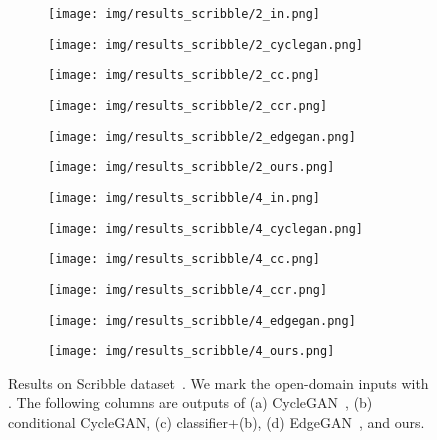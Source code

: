 \documentclass[10pt,twocolumn,letterpaper]{article}
\begin{document}
\begin{figure}[tbp]
\begin{center}
  \begin{subfigure}[b]{\scribblewidth\linewidth}
  \texttt{[image: img/results\_scribble/2\_in.png]}
  \end{subfigure}
  \begin{subfigure}[b]{\scribblewidth\linewidth}
  \texttt{[image: img/results\_scribble/2\_cyclegan.png]}
  \end{subfigure}
   \begin{subfigure}[b]{\scribblewidth\linewidth}
  \texttt{[image: img/results\_scribble/2\_cc.png]}
  \end{subfigure}
   \begin{subfigure}[b]{\scribblewidth\linewidth}
  \texttt{[image: img/results\_scribble/2\_ccr.png]}
  \end{subfigure}
 \begin{subfigure}[b]{\scribblewidth\linewidth}
  \texttt{[image: img/results\_scribble/2\_edgegan.png]}
  \end{subfigure}
  \begin{subfigure}[b]{\scribblewidth\linewidth}
  \texttt{[image: img/results\_scribble/2\_ours.png]}
  \end{subfigure}
  
  \begin{subfigure}[b]{\scribblewidth\linewidth}
  \texttt{[image: img/results\_scribble/4\_in.png]}
  \end{subfigure}
  \begin{subfigure}[b]{\scribblewidth\linewidth}
  \texttt{[image: img/results\_scribble/4\_cyclegan.png]}
  \end{subfigure}
\begin{subfigure}[b]{\scribblewidth\linewidth}
  \texttt{[image: img/results\_scribble/4\_cc.png]}
  \end{subfigure}
\begin{subfigure}[b]{\scribblewidth\linewidth}
  \texttt{[image: img/results\_scribble/4\_ccr.png]}
  \end{subfigure}
\begin{subfigure}[b]{\scribblewidth\linewidth}
  \texttt{[image: img/results\_scribble/4\_edgegan.png]}
  \end{subfigure}
  \begin{subfigure}[b]{\scribblewidth\linewidth}
  \texttt{[image: img/results\_scribble/4\_ours.png]}
  \end{subfigure}
\end{center}
\caption{Results on Scribble dataset~\cite{ghosh2019interactive}. We mark the open-domain inputs with \textcolor{blue}{}. The following columns are outputs of (a) CycleGAN~\cite{zhu2017unpaired}, (b) conditional CycleGAN, (c) classifier+(b), (d) EdgeGAN~\cite{gao2020sketchycoco}, and ours.}
 \label{fig:scribble_results}
\end{figure}
\end{document}

